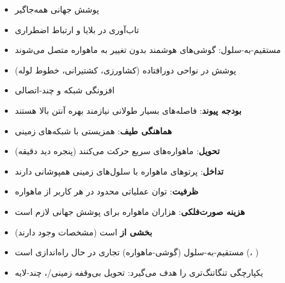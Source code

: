 



\begin{itemize}
\tightlist
\item
  پوشش جهانی همه‌جاگیر
\item
  تاب‌آوری در بلایا و ارتباط اضطراری
\item
  مستقیم-به-سلول: گوشی‌های هوشمند بدون تغییر به ماهواره متصل می‌شوند
\item
  پوشش  در نواحی دورافتاده (کشاورزی، کشتیرانی، خطوط لوله)
\item
  افزونگی شبکه و چند-اتصالی
\end{itemize}


\begin{itemize}
\tightlist
\item
  \textbf{بودجه پیوند}: فاصله‌های بسیار طولانی نیازمند بهره آنتن بالا هستند
\item
  \textbf{هماهنگی طیف}: همزیستی با شبکه‌های زمینی
\item
  \textbf{تحویل}: ماهواره‌های  سریع حرکت می‌کنند (پنجره دید  دقیقه)
\item
  \textbf{تداخل}: پرتوهای ماهواره با سلول‌های زمینی همپوشانی دارند
\item
  \textbf{ظرفیت}: توان عملیاتی محدود در هر کاربر از ماهواره
\item
  \textbf{هزینه صورت‌فلکی}: هزاران ماهواره برای پوشش جهانی  لازم است
\end{itemize}


\begin{itemize}
\tightlist
\item
   \textbf{بخشی از}  است (مشخصات  وجود دارند)
\item
  مستقیم-به-سلول (گوشی-ماهواره) تجاری در حال راه‌اندازی است (، )
\item
   یکپارچگی تنگاتنگ‌تری را هدف می‌گیرد: تحویل بی‌وقفه زمینی/\allowbreak{}،  چند-لایه
\end{itemize}

